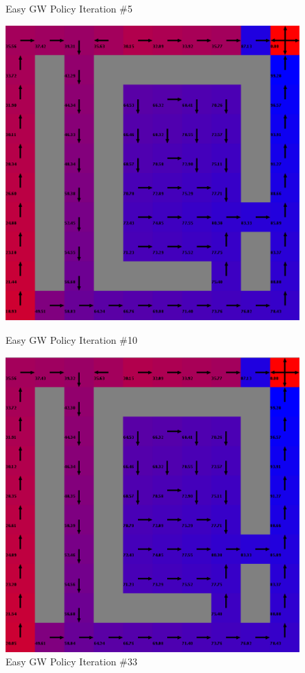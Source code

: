 \documentclass[h]{article}
\begin{document}
\begin{figure}[H]
      \caption*{Easy GW Policy Iteration \#5} 
   \endminipage\hfill
      \includegraphics[width=1\textwidth,keepaspectratio]{easy-policy-10.png} 
      \caption*{Easy GW Policy Iteration \#10} 
   \endminipage\hfill
      \includegraphics[width=1\textwidth,keepaspectratio]{easy-policy-33.png} 
      \caption*{Easy GW Policy Iteration \#33} 
   \endminipage\hfill
\end{figure}
\end{document}

